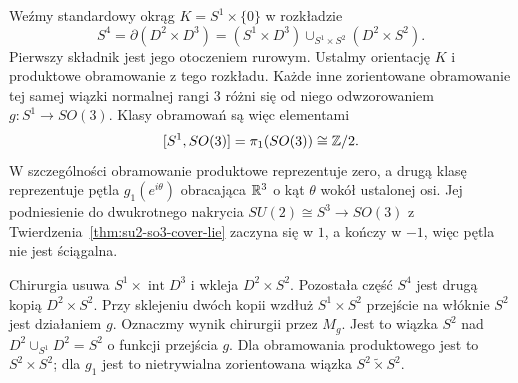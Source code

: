 \begin{przyklad}
\label{prz:dwa-obramowania-S1-S4-21}
Weźmy standardowy okrąg $K=S^1\times\{0\}$ w rozkładzie
\[
 S^4=\partial(D^2\times D^3)
    =(S^1\times D^3)\cup_{S^1\times S^2}(D^2\times S^2).
\]
Pierwszy składnik jest jego otoczeniem rurowym. Ustalmy
orientację $K$ i produktowe obramowanie z tego rozkładu.
Każde inne zorientowane obramowanie tej samej wiązki
normalnej rangi $3$ różni się od niego odwzorowaniem
$g:S^1\to SO(3)$. Klasy obramowań są więc elementami
\[
 [S^1,SO(3)]=\pi_1(SO(3))\cong\mathbb{Z}/2.
\]
W szczególności obramowanie produktowe reprezentuje zero,
a drugą klasę reprezentuje pętla $g_1(e^{i\theta})$
obracająca $\mathbb{R}^3$ o kąt $\theta$ wokół ustalonej osi.
Jej podniesienie do dwukrotnego nakrycia
$SU(2)\cong S^3\to SO(3)$ z
Twierdzenia~\ref{thm:su2-so3-cover-lie} zaczyna się w $1$,
a kończy w $-1$, więc pętla nie jest ściągalna.

Chirurgia usuwa $S^1\times\operatorname{int}D^3$
i wkleja $D^2\times S^2$. Pozostała część $S^4$
jest drugą kopią $D^2\times S^2$. Przy sklejeniu
dwóch kopii wzdłuż $S^1\times S^2$ przejście na
włóknie $S^2$ jest działaniem $g$.
Oznaczmy wynik chirurgii przez $M_g$.
Jest to wiązka $S^2$ nad
$D^2\cup_{S^1}D^2=S^2$ o funkcji przejścia $g$.
Dla obramowania produktowego jest to $S^2\times S^2$;
dla $g_1$ jest to nietrywialna zorientowana wiązka
$S^2\widetilde{\times}S^2$.


\end{przyklad}
